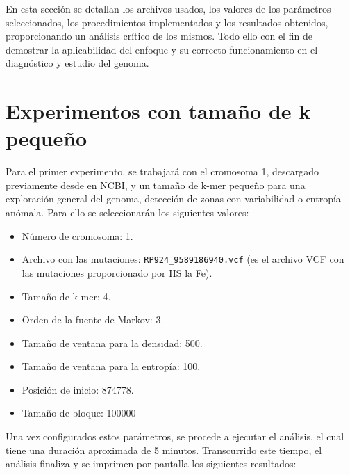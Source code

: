 \documentclass[11pt,spanish,listoffigures,listoftables]{tfgetsinf}
\begin{document}
En esta sección se detallan los archivos usados, los valores de los parámetros seleccionados, los procedimientos implementados y los resultados obtenidos, proporcionando un análisis crítico de los mismos. Todo ello con el fin de demostrar la aplicabilidad del enfoque y su correcto funcionamiento en el diagnóstico y estudio del genoma.  

\section{Experimentos con tamaño de k pequeño}

Para el primer experimento, se trabajará con el cromosoma 1, descargado previamente desde en NCBI, y un tamaño de k-mer pequeño para una exploración general del genoma, detección de zonas con variabilidad o entropía anómala. Para ello se seleccionarán los siguientes valores: 

\begin{itemize}
   \item Número de cromosoma: 1.
   \item Archivo con las mutaciones: \texttt{RP924\_9589186940.vcf}  (es el archivo VCF con las mutaciones proporcionado por IIS la Fe).
   \item Tamaño de k-mer: 4.
   \item Orden de la fuente de Markov: 3.
   \item Tamaño de ventana para la densidad: 500.
   \item Tamaño de ventana para la entropía: 100.
   \item Posición de inicio: 874778.
   \item Tamaño de bloque: 100000 
\end{itemize}
 

Una vez configurados estos parámetros, se procede a ejecutar el análisis, el cual tiene una duración aproximada de 5 minutos. Transcurrido este tiempo, el análisis finaliza y se imprimen por pantalla los siguientes resultados:
\end{document}
